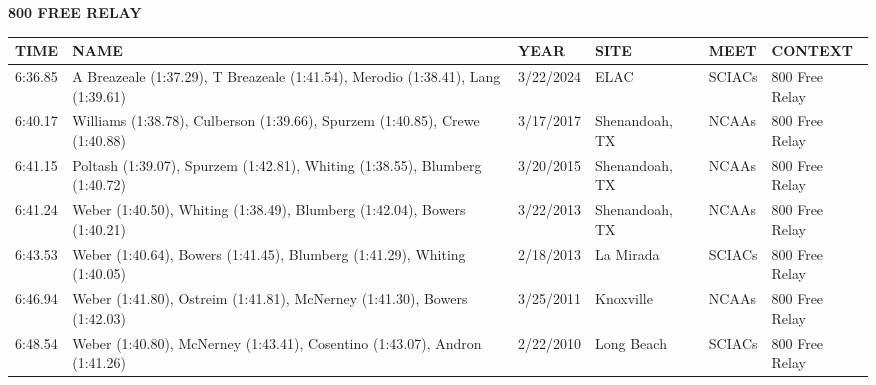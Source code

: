 \begin{table}[H]
\centering
\begin{minipage}[t]{0.6\textwidth}
\centering
\textbf{800 FREE RELAY}\\[0.1cm]
\begin{tabular}{@{}p{1.8cm}p{2.8cm}p{1.2cm}p{1.4cm}p{1.4cm}p{2.0cm}@{}}
\hline
    \textbf{TIME} & \textbf{NAME} & \textbf{YEAR} & \textbf{SITE} & \textbf{MEET} & \textbf{CONTEXT} \\
\hline
    6:36.85 & A Breazeale (1:37.29), T Breazeale (1:41.54), Merodio (1:38.41), Lang (1:39.61) & 3/22/2024 & ELAC & SCIACs & 800 Free Relay \\
    6:40.17 & Williams (1:38.78), Culberson (1:39.66), Spurzem (1:40.85), Crewe (1:40.88) & 3/17/2017 & Shenandoah, TX & NCAAs & 800 Free Relay \\
    6:41.15 & Poltash (1:39.07), Spurzem (1:42.81), Whiting (1:38.55), Blumberg (1:40.72) & 3/20/2015 & Shenandoah, TX & NCAAs & 800 Free Relay \\
    6:41.24 & Weber (1:40.50), Whiting (1:38.49), Blumberg (1:42.04), Bowers (1:40.21) & 3/22/2013 & Shenandoah, TX & NCAAs & 800 Free Relay \\
    6:43.53 & Weber (1:40.64), Bowers (1:41.45), Blumberg (1:41.29), Whiting (1:40.05) & 2/18/2013 & La Mirada & SCIACs & 800 Free Relay \\
    6:46.94 & Weber (1:41.80), Ostreim (1:41.81), McNerney (1:41.30), Bowers (1:42.03) & 3/25/2011 & Knoxville & NCAAs & 800 Free Relay \\
    6:48.54 & Weber (1:40.80), McNerney (1:43.41), Cosentino (1:43.07), Andron (1:41.26) & 2/22/2010 & Long Beach & SCIACs & 800 Free Relay \\
\hline
\end{tabular}
\end{minipage}
\end{table}

